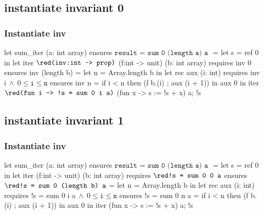 \documentclass[xcolor=dvipsnames]{beamer}
\newcommand{\OliveGreen}[1]{\textcolor{OliveGreen}{#1}}
\newcommand{\bwedge}{\boldsymbol{~\wedge~}}
\begin{document}
\subsection*{instantiate invariant 0}
\begin{frame}[fragile]
\frametitle{\OliveGreen{Instantiate inv}}
\vspace*{0em}
\begin{footnotesize}
\begin{whycode}
let sum_iter (a: int array) 
ensures { $\texttt{result = sum 0 (length a) a }$}
= let s = ref 0 in 
  let iter ${\red \texttt{(inv:int -> prop)}}$ (f:int -> unit) (b: int array)
  requires { inv 0 } 
  ensures  { inv (length b) } 
  = let n = Array.length b in
    let rec aux (i: int)
    requires { inv i$\bwedge 0 \leq \texttt{i} \leq \texttt{n}$ }
    ensures  { inv n }
    = if i < n
      then (f b.(i) ; aux (i + 1)) 
    in aux 0
  in iter ${\red \texttt{(fun i -> !s = sum 0 i a)}}$ (fun x -> s := !s + x) a; 
  !s
\end{whycode}
\end{footnotesize}
\end{frame}
\addtocounter{framenumber}{-1}

\subsection*{instantiate invariant 1}
\begin{frame}[fragile]
\frametitle{\OliveGreen{Instantiate inv}}
\vspace*{0em}
\begin{footnotesize}
\begin{whycode}
let sum_iter (a: int array) 
ensures { $\texttt{result = sum 0 (length a) a }$}
= let s = ref 0 in 
  let iter (f:int -> unit) (b: int array)
  requires { ${\red \texttt{!s = sum 0 0 a}}$ } 
  ensures  { ${\red \texttt{!s = sum 0 (length b) a}}$ } 
  = let n = Array.length b in
    let rec aux (i: int)
    requires { !s = sum 0 i a$\bwedge 0 \leq \texttt{i} \leq \texttt{n}$ }
    ensures  { !s = sum 0 n a }
    = if i < n
      then (f b.(i) ; aux (i + 1)) 
    in aux 0
  in iter (fun x -> s := !s + x) a; 
  !s
\end{whycode}
\end{footnotesize}
\end{frame}
\addtocounter{framenumber}{-1}
\end{document}

